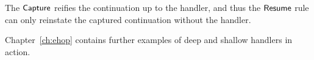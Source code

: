 \documentclass[12pt,phd,lfcs,twoside,openright,logo,leftchapter,normalheadings]{infthesis}
\theoremstyle{plain}
\theoremstyle{definition}
\begin{document}
%
The $\mathsf{Capture}$ reifies the continuation up to the handler, and
thus the $\mathsf{Resume}$ rule can only reinstate the captured
continuation without the handler.
%
%

Chapter~\ref{ch:ehop} contains further examples of deep and shallow
handlers in action.
%

%
\end{document}
